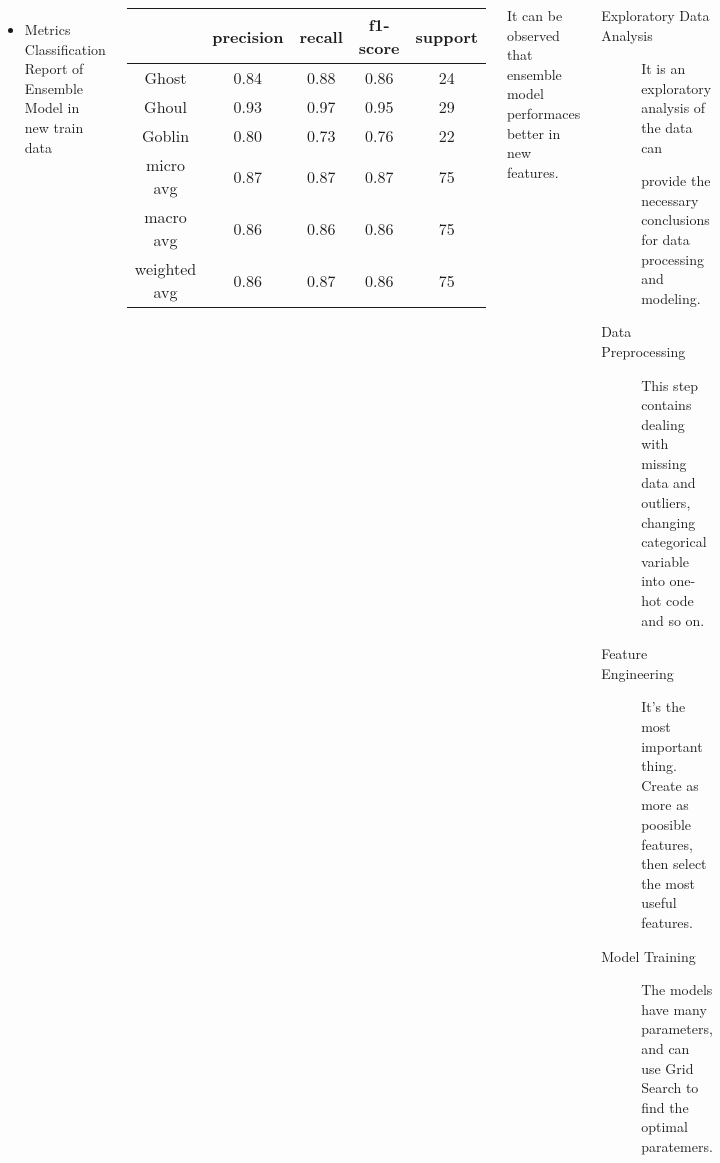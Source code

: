 \documentclass{tikzposter} %
\begin{document}
\begin{columns}
{	\begin{itemize}
		\item Metrics Classification Report of Ensemble Model in new train data
	\end{itemize}
	\vspace{.5cm}
	\begin{center}
		\begin{tabular}{ccccc}
			\hline
			&precision & recall & f1-score & support\\
			\hline
			Ghost  &  0.84  &  0.88  & 0.86 &  24\\
			Ghoul  &  0.93  & 0.97 &  0.95 &   29\\
			Goblin  &  0.80 &  0.73  & 0.76  &  22\\
			\hline
			micro avg & 0.87  & 0.87  & 0.87  & 75\\
			macro avg &  0.86  &  0.86 & 0.86 &   75\\
			weighted avg  &  0.86 & 0.87  &  0.86  &  75\\
			\hline 
		\end{tabular}
	\end{center}
	\vspace{.5cm}
	It can be observed that ensemble model
	performaces better in new features.
	
}


{
	\begin{description}
		\item[Exploratory Data Analysis] It is an 
		exploratory analysis of the data can 
		 
		provide the necessary conclusions 
		for data processing and modeling.
		\vspace{.5cm}
		\item[Data Preprocessing] This step contains
		dealing with missing data and outliers,
		changing categorical variable 
		into one-hot code and so on.
		\vspace{.5cm}
		\item[Feature Engineering] It's the 
		most important thing.
		Create as more as poosible features,
		then select the most useful features.
		\vspace{.5cm}
		\item[Model Training] The models have 
		many parameters,
		and can use Grid Search to find 
		the optimal paratemers.	
	\end{description}
}



\end{columns}
\end{document}

